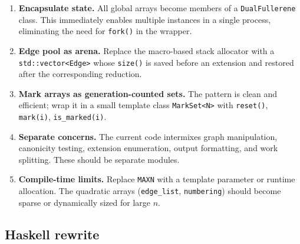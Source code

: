 \documentclass[11pt,a4paper]{article}
\theoremstyle{definition}
\begin{document}
\begin{enumerate}[nosep]
  \item \textbf{Encapsulate state.}  All global arrays become members
    of a \texttt{DualFullerene} class.  This immediately enables
    multiple instances in a single process, eliminating the need for
    \texttt{fork()} in the wrapper.

  \item \textbf{Edge pool as arena.}  Replace the macro-based
    stack allocator with a \texttt{std::vector<Edge>} whose
    \texttt{size()} is saved before an extension and restored after
    the corresponding reduction.

  \item \textbf{Mark arrays as generation-counted sets.}  The
    pattern is clean and efficient; wrap it in a small template class
    \texttt{MarkSet<N>} with \texttt{reset()}, \texttt{mark(i)},
    \texttt{is\_marked(i)}.

  \item \textbf{Separate concerns.}  The current code intermixes
    graph manipulation, canonicity testing, extension enumeration,
    output formatting, and work splitting.  These should be separate
    modules.

  \item \textbf{Compile-time limits.}  Replace \texttt{MAXN} with a
    template parameter or runtime allocation.  The quadratic arrays
    (\texttt{edge\_list}, \texttt{numbering}) should become sparse or
    dynamically sized for large $n$.
\end{enumerate}

\subsection{Haskell rewrite}
\end{document}
